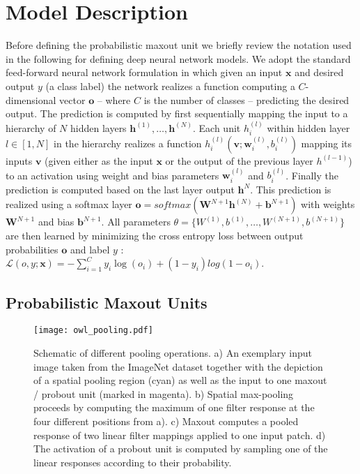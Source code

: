 \documentclass{article} \pdfoutput=1
\begin{document}
\section{Model Description}
Before defining the probabilistic maxout unit we briefly review the
notation used in the following for defining deep neural network
models. We adopt the standard feed-forward neural network formulation
in which given an input $\mathbf{x}$ and desired output $y$ (a
class label) the network realizes a function computing a
$C$-dimensional vector $\mathbf{o}$ -- where $C$ is the number of
classes -- predicting the desired output.  The prediction is computed
by first sequentially mapping the input to a hierarchy of $N$ hidden
layers $\mathbf{h}^{(1)}, \dots, \mathbf{h}^{(N)}$. Each unit
$h_i^{(l)}$ within hidden layer $l \in [1,N]$ in the hierarchy
realizes a function $h_i^{(l)}(\mathbf{v}; \mathbf{w}^{(l)}_i,
b^{(l)}_i)$ mapping its inputs $\mathbf{v}$ (given either as the input
$\mathbf{x}$ or the output of the previous layer $h^{(l-1)}$) to an
activation using weight and bias parameters $\mathbf{w}^{(l)}_i$ and
$b^{(l)}_i$. Finally the prediction is computed based on the last
layer output $\mathbf{h}^{N}$. This prediction is realized using a
softmax layer $\mathbf{o} = softmax(\mathbf{W}^{N+1} \mathbf{h}^{(N)}
+ \mathbf{b}^{N+1})$ with weights $\mathbf{W}^{N+1}$ and bias
$\mathbf{b}^{N+1}$. All parameters $\theta = \{ W^{(1)}, b^{(1)},
\dots, W^{(N+1)}, b^{(N+1)} \}$ are then learned by minimizing the
cross entropy loss between output probabilities $\mathbf{o}$ and label
$y$ : $ \mathcal{L}(o, y; \mathbf{x}) = - \sum_{i = 1}^C y_i \log(o_i)
+ (1 - y_i) log(1 - o_i)$.

\subsection{Probabilistic Maxout Units}
\begin{figure}
\centering
\texttt{[image: owl\_pooling.pdf]}
\caption{Schematic of different pooling
  operations. a) An exemplary input image taken from the ImageNet
  dataset together with the depiction of a spatial pooling region (cyan) as well as
  the input to one maxout / probout unit (marked in magenta). b)
  Spatial max-pooling proceeds by computing the maximum of one filter
  response at the four different positions from a). c) Maxout computes
  a pooled response of two linear filter mappings applied to
  one input patch. d) The activation of a probout unit is computed by
  sampling one of the linear responses according to their probability.}
\label{pooling_fig}
\end{figure}
\end{document}
